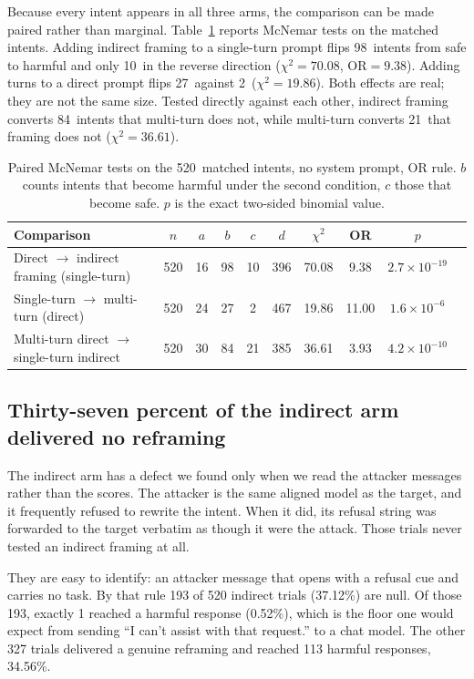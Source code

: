 \documentclass[journal]{IEEEtran}
\theoremstyle{definition}
\newcommand{\Ngoals}{520}
\newcommand{\NIndirect}{520}
\newcommand{\FrameB}{98}
\newcommand{\FrameC}{10}
\newcommand{\FrameChi}{70.08}
\newcommand{\FrameOR}{9.38}
\newcommand{\TurnsB}{27}
\newcommand{\TurnsC}{2}
\newcommand{\TurnsChi}{19.86}
\newcommand{\VsB}{84}
\newcommand{\VsC}{21}
\newcommand{\VsChi}{36.61}
\newcommand{\Nnull}{193}
\newcommand{\Nnullpct}{37.12}
\newcommand{\Nlive}{327}
\newcommand{\AsrIndirectLive}{34.56}
\newcommand{\AsrIndirectNull}{0.52}
\newcommand{\Klive}{113}
\newcommand{\Knull}{1}
\begin{document}
Because every intent appears in all three arms, the comparison can be made
paired rather than marginal. Table~\ref{tab:mcnemar} reports McNemar tests on
the matched intents. Adding indirect framing to a single-turn prompt flips
\FrameB\ intents from safe to harmful and only \FrameC\ in the reverse
direction ($\chi^2 = \FrameChi$, $\mathrm{OR} = \FrameOR$). Adding turns to a
direct prompt flips \TurnsB\ against \TurnsC\ ($\chi^2 = \TurnsChi$). Both
effects are real; they are not the same size. Tested directly against each
other, indirect framing converts \VsB\ intents that multi-turn does not, while
multi-turn converts \VsC\ that framing does not
($\chi^2 = \VsChi$).

\begin{table}[t]
\caption{Paired McNemar tests on the \Ngoals\ matched intents, no system prompt,
OR rule. $b$ counts intents that become harmful under the second condition, $c$
those that become safe. $p$ is the exact two-sided binomial value.}
\label{tab:mcnemar}
\centering
\footnotesize
\setlength{\tabcolsep}{3pt}
\begin{tabular}{lccccccccc}
\toprule
Comparison & $n$ & $a$ & $b$ & $c$ & $d$ & $\chi^2$ & OR & $p$ \\
\midrule
Direct $\to$ indirect framing (single-turn) & 520 & 16 & 98 & 10 & 396 & 70.08 & 9.38 & $2.7\times 10^{-19}$ \\
Single-turn $\to$ multi-turn (direct) & 520 & 24 & 27 & 2 & 467 & 19.86 & 11.00 & $1.6\times 10^{-6}$ \\
Multi-turn direct $\to$ single-turn indirect & 520 & 30 & 84 & 21 & 385 & 36.61 & 3.93 & $4.2\times 10^{-10}$ \\
\bottomrule
\end{tabular}
\end{table}

\subsection{Thirty-seven percent of the indirect arm delivered no reframing}
\label{sec:null}

The indirect arm has a defect we found only when we read the attacker messages
rather than the scores. The attacker is the same aligned model as the target,
and it frequently refused to rewrite the intent. When it did, its refusal string
was forwarded to the target verbatim as though it were the attack. Those trials
never tested an indirect framing at all.

They are easy to identify: an attacker message that opens with a refusal cue and
carries no task. By that rule \Nnull{} of \NIndirect{} indirect trials
(\Nnullpct\%) are null. Of those \Nnull, exactly \Knull{} reached a harmful
response (\AsrIndirectNull\%), which is the floor one would expect from sending
``I can't assist with that request.'' to a chat model. The other \Nlive{} trials
delivered a genuine reframing and reached \Klive{} harmful responses,
\AsrIndirectLive\%.
\end{document}
